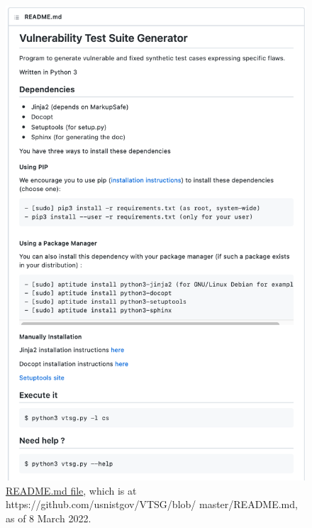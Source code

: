 \begin{appendices}
\begin{figure}[htbp]
  \includegraphics[width=0.8\linewidth]{fig_README_md.png}
  \caption{\href{https://github.com/usnistgov/VTSG/blob/master/README.md}
    {README.md file}, which is at
    https://github.com/usnistgov/VTSG/blob/ master/README.md,
    as of 8 March 2022.}
  \label{fig:README.md file}
\end{figure}



\end{appendices}
